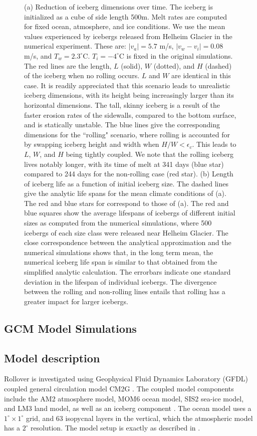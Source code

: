 \documentclass[twocol]{ametsoc_tw}
\begin{document}
\begin{figure}[!t]
\begin{center}
 \caption{(a) Reduction of iceberg dimensions over time. The iceberg is initialized as a cube of side length 500m. Melt rates are computed for fixed ocean, atmosphere, and ice conditions. We use the mean values experienced by icebergs released from Helheim Glacier in the numerical experiment. These are: $|v_a| = 5.7$ m/s, $|v_w-v_i| = 0.08$ m/s, and $T_w = 2.3^\circ$C. $T_i = -4^\circ$C is fixed in the original simulations. The red lines are the length, $L$ (solid), $W$ (dotted), and $H$ (dashed) of the iceberg when no rolling occurs. $L$ and $W$ are identical in this case. It is readily appreciated that this scenario leads to unrealistic iceberg dimensions, with its height being increasingly larger than its horizontal dimensions. The tall, skinny iceberg is a result of the faster erosion rates of the sidewalls, compared to the bottom surface, and is statically unstable. The blue lines give the corresponding dimensions for the ``rolling" scenario, where rolling is accounted for by swapping iceberg height and width when $H/W<\epsilon_c$. This leads to $L$, $W$, and $H$ being tightly coupled. We note that the rolling iceberg lives notably longer, with its time of melt at 341 days (blue star) compared to 244 days for the non-rolling case (red star). (b) Length of iceberg life as a function of initial iceberg size. The dashed lines give the analytic life spans for the mean climate conditions of (a). The red and blue stars for correspond to those of (a). The red and blue squares show the average lifespans of icebergs of different initial sizes as computed from the numerical simulations, where 500 icebergs of each size class were released near Helheim Glacier. The close correspondence between the analytical approximation and the numerical simulations shows that, in the long term mean, the numerical iceberg life span is similar to that obtained from the simplified analytic calculation. The errorbars indicate one standard deviation in the lifespan of individual icebergs. The divergence between the rolling and non-rolling lines entails that rolling has a greater impact for larger icebergs.}
 \label{fig:bergschem}
 \end{center}
\end{figure}

\subsection{GCM Model Simulations}
\subsection{Model description}
Rollover is investigated using Geophysical Fluid Dynamics Laboratory (GFDL) coupled general circulation model CM2G \citep{Delworth2006,Dunne2012}. The coupled model components include the AM2 atmosphere model, MOM6 ocean model, SIS2 sea-ice model, and LM3 land model, as well as an iceberg component \citep{Martin2010}. The ocean model uses a $1^{\circ} \times 1^{\circ}$ grid, and 63 isopycnal layers in the vertical, which the atmospheric model has a $2^{\circ}$ resolution. 
The model setup is exactly as described in \citep{Stern2016}.
\end{document}
